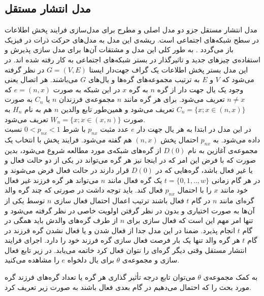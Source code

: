 \begin{persian}
\subsection{مدل انتشار مستقل}
\noindent
{
مدل انتشار مستقل جزو دو مدل اصلی و مطرح برای مدل‌سازی فرایند پخش اطلاعات در سطح شبکه‌های اجتماعی است. ریشه‌ی این مدل به مدل‌های حرکت ذرات در فیزیک باز می‌گردد \cite{chen_scalable_2010}. به طور کلی این مدل و مشتقات آن‌ها برای مدل سازی پذیرش و استفاده‌ی چیز‌های جدید و تاثیرگذار در بستر شبکه‌های اجتماعی به کار رفته شده اند. در این مدل بستر پخش اطلاعات یک گراف جهت‌دار ایستا $G =(V,E)$ در نظر گرفته می‌شود که $V$ و $E$ به ترتیب مجموعه‌های گره‌ها و یال‌های $G$ می‌باشند. هر اتصال یعنی وجود یک یال جهت دار از گره $n$ به گره $x$ در این شبکه به صورت $e=(n,x)$ که $n \neq x$ تعریف می‌شود.
برای هر گره‌ مانند $n$ مجموعه‌ی فرزندان $n$ یا $C_n$ به صورت $C_n = \{x; x \in (n,x)\}$ تعریف می‌شود و همین‌طور تابع والدین $n$ هم به نام $H_n$ به صورت $W_n =\{x; x \in (x,n)\}$ تعریف می‌شود. \\
\indent
در این مدل در ابتدا به هر یال جهت دار $e$ عدد مثبت $p_{nx}$ با شرط $0 < p_{nx} < 1$ نسبت داده می‌شود. به $p_{nx} $ احتمال پخش $(n,x)$ هم گفته می‌شود. فرایند پخش با انتخاب یک مجموعه‌ی آغازین به نام $D(0)$ از گره‌های شبکه‌ی مورد مطالعه شروع می‌شود، بدین صورت که با فرض این امر که در اینجا نیز هر گره می‌تواند در یکی از دو حالت فعال و یا غیر فعال باشد، گره‌هایی که در $D(0)$ قرار دارند در حالت فعال فرض می‌شوند و در هر گام زمانی $t=\{0,1,..,w\}$ یک گره فعال مانند ‌$n$ می‌تواند هر گره فرزند غیر فعال خود مانند $x$ را با احتمال $p_{nx}$ فعال کند. باید توجه داشت در صورتی که چند گره والد گره‌ای مانند $n$ در گام $t$ فعال باشند ترتیب اعمال احتمال فعال سازی $n$ توسط یکی از آن‌ها به صورت اختیاری و بدون در نظر گرفتن اولویت خاصی در نظر گرفته می‌شود و تنها امر مهم این است که فعال سازی برای $n$ از طرف گره‌های والدش باید همگی در گام $t$ انجام پذیرد. ضمنا در این مدل جدا از فعال شدن و یا فعال نشدن گره فرزند در گام $t$ هر گره والد تنها یک بار فرصت فعال سازی گره فرزند خود را دارد. اجرای فرایند انتشار مستقل وقتی دیگر گره‌ای را نتوان 
فعال کرد خاتمه می‌یابد.
در زیر تابع فعال سازی و مجموعه‌ی $\theta$ برای یال دلخواه $e$ را مشاهده می‌کنید.

\centerline{
}

به کمک مجموعه‌ی $\theta$ می‌توان تابع درجه تأثیر گذاری هر گره‌ یا تعداد گره‌های فرزند گره مورد بحث را که احتمال می‌دهیم در گام بعدی فعال باشند به صورت زیر تعریف کرد.

}
\end{persian}
